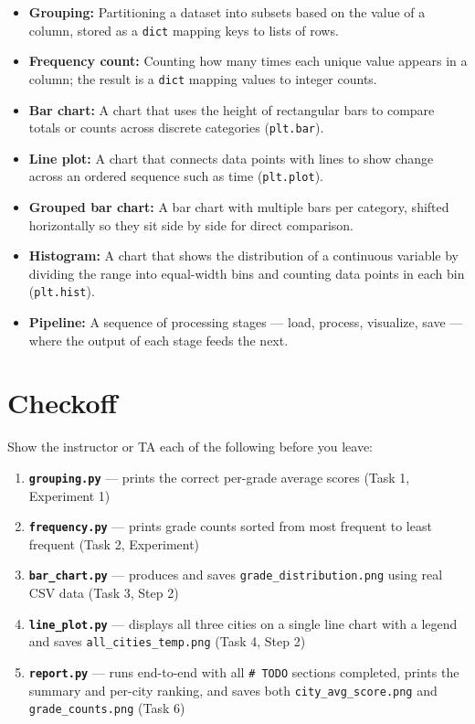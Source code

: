 \documentclass{cslab}
\begin{document}
\begin{itemize}
    \item \textbf{Grouping:} Partitioning a dataset into subsets based on the value of a column, stored as a \texttt{dict} mapping keys to lists of rows.
    \item \textbf{Frequency count:} Counting how many times each unique value appears in a column; the result is a \texttt{dict} mapping values to integer counts.
    \item \textbf{Bar chart:} A chart that uses the height of rectangular bars to compare totals or counts across discrete categories (\texttt{plt.bar}).
    \item \textbf{Line plot:} A chart that connects data points with lines to show change across an ordered sequence such as time (\texttt{plt.plot}).
    \item \textbf{Grouped bar chart:} A bar chart with multiple bars per category, shifted horizontally so they sit side by side for direct comparison.
    \item \textbf{Histogram:} A chart that shows the distribution of a continuous variable by dividing the range into equal-width bins and counting data points in each bin (\texttt{plt.hist}).
    \item \textbf{Pipeline:} A sequence of processing stages --- load, process, visualize, save --- where the output of each stage feeds the next.
\end{itemize}

\section{Checkoff}

Show the instructor or TA each of the following before you leave:

\begin{enumerate}
    \item \textbf{\texttt{grouping.py}} --- prints the correct per-grade average scores (Task 1, Experiment 1)
    \item \textbf{\texttt{frequency.py}} --- prints grade counts sorted from most frequent to least frequent (Task 2, Experiment)
    \item \textbf{\texttt{bar\_chart.py}} --- produces and saves \texttt{grade\_distribution.png} using real CSV data (Task 3, Step 2)
    \item \textbf{\texttt{line\_plot.py}} --- displays all three cities on a single line chart with a legend and saves \texttt{all\_cities\_temp.png} (Task 4, Step 2)
    \item \textbf{\texttt{report.py}} --- runs end-to-end with all \texttt{\# TODO} sections completed, prints the summary and per-city ranking, and saves both \texttt{city\_avg\_score.png} and \texttt{grade\_counts.png} (Task 6)
\end{enumerate}
\end{document}
